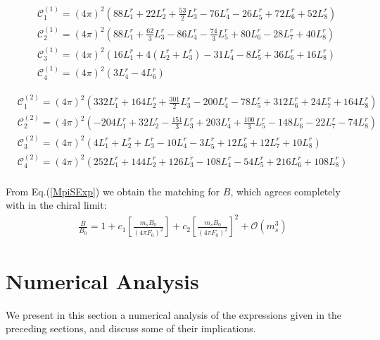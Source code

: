 \documentclass[12pt,a4paper]{article}
\begin{document}
\begin{align}
	& \mathcal{C}_1^{(1)} = (4 \pi)^2 \left( 88 L^r_{1} + 22 L^r_{2} + \frac{53}{2}L^r_{3} - 76 L^r_{4} - 26 L^r_{5} + 72 L^r_{6} + 52 L^r_{8} \right) \nonumber  \\
	& \mathcal{C}_2^{(1)} = (4 \pi)^2 \left( 88 L^r_{1} + \frac{62}{3} L^r_{3} - 86 L^r_{4} - \frac{74}{3} L^r_{5} + 80 L^r_{6} - 28 L^r_{7} + 40 L^r_{8} \right) \nonumber \\
	& \mathcal{C}_3^{(1)} = (4 \pi)^2 \left( 16 L^r_1 + 4( L^r_2 + L^r_3) - 31 L^r_4 - 8 L^r_5 + 36 L^r_6 + 16 L^r_8 \right) \nonumber \\
	& \mathcal{C}_4^{(1)} = (4 \pi)^2 \left( 3 L^r_{4} - 4 L^r_{6} \right)
\end{align}

\begin{align}
	& \mathcal{C}_1^{(2)} = (4 \pi)^2 \left( 332 L^r_{1} + 164 L^r_{2} +\frac{301}{2} L^r_{3} - 200 L^r_{4} - 78 L^r_{5} + 312 L^r_{6} + 24 L^r_{7} + 164 L^r_{8} \right) \nonumber  \\
	& \mathcal{C}_2^{(2)} = (4 \pi)^2 \left( -204 L^r_{1} + 32 L^r_{2} - \frac{151}{3} L^r_{3} + 203 L^r_{4} + \frac{100}{3} L^r_{5} - 148 L^r_{6} - 22 L^r_{7} - 74 L^r_{8} \right) \nonumber \\
	& \mathcal{C}_3^{(2)} = (4 \pi)^2 \left( 4 L^r_{1} + L^r_{2}+ L^r_{3} - 10 L^r_{4} - 3 L^r_{5} + 12 L^r_{6} + 12 L^r_{7} + 10 L^r_{8} \right)  \nonumber \\
	& \mathcal{C}_4^{(2)} = (4 \pi)^2 \left( 252 L^r_{1} + 144 L^r_{2} + 126 L^r_{3} - 108 L^r_{4} - 54 L^r_{5} + 216 L^r_{6} + 108 L^r_{8} \right) \\ \nonumber
\end{align}

From Eq.(\ref{MpiSExp}) we obtain the matching for $B$, which agrees completely with \cite{Kaiser:2006uv} in the chiral limit:
\begin{align}
	\frac{B}{B_0} = 1 + c_1 \left[ \frac{m_s B_0}{(4 \pi F_0)^2} \right] + c_2 \left[ \frac{m_s B_0}{(4 \pi F_0)^2} \right]^2 + \mathcal{O}(m_s^3)  \label{Bmatching}
\end{align}


\section{Numerical Analysis \label{SecNum}}

We present in this section a numerical analysis of the expressions given in the preceding sections, and discuss some of their implications.
\end{document}
